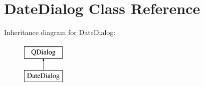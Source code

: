 \hypertarget{class_date_dialog}{\section{Date\-Dialog Class Reference}
\label{class_date_dialog}
}
Inheritance diagram for Date\-Dialog\-:\begin{figure}[H]
\begin{center}
\leavevmode
\includegraphics[height=2.000000cm]{class_date_dialog}
\end{center}
\end{figure}
